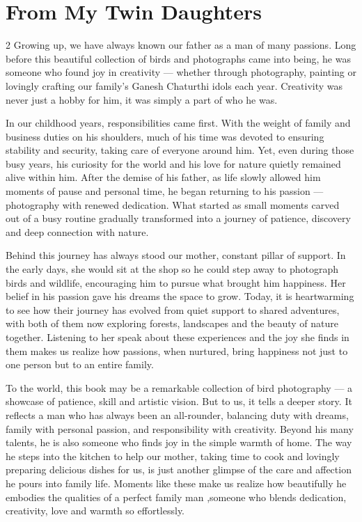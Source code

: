 \documentclass[12pt]{article}
\begin{document}
\section*{From My Twin Daughters}
\begin{multicols}{2}
\noindent Growing up, we have always known our father as a man of many passions. Long before this beautiful collection of birds and photographs came into being, he was someone who found joy in creativity — whether through photography, painting or lovingly crafting our family's Ganesh Chaturthi idols each year. Creativity was never just a hobby for him, it was simply a part of who he was.

In our childhood years, responsibilities came first. With the weight of family and business duties on his shoulders, much of his time was devoted to ensuring stability and security, taking care of everyone around him. Yet, even during those busy years, his curiosity for the world and his love for nature quietly remained alive within him. After the demise of his father, as life slowly allowed him moments of pause and personal time, he began returning to his passion — photography with renewed dedication. What started as small moments carved out of a busy routine gradually transformed into a journey of patience, discovery and deep connection with nature.

Behind this journey has always stood our mother, constant pillar of support. In the early days, she would sit at the shop so he could step away to photograph birds and wildlife, encouraging him to pursue what brought him happiness. Her belief in his passion gave his dreams the space to grow. Today, it is heartwarming to see how their journey has evolved from quiet support to shared adventures, with both of them now exploring forests, landscapes and the beauty of nature together. Listening to her speak about these experiences and the joy she finds in them makes us realize how passions, when nurtured, bring happiness not just to one person but to an entire family.

To the world, this book may be a remarkable collection of bird photography — a showcase of patience, skill and artistic vision. But to us, it tells a deeper story. It reflects a man who has always been an all-rounder, balancing duty with dreams, family with personal passion, and responsibility with creativity. Beyond his many talents, he is also someone who finds joy in the simple warmth of home. The way he steps into the kitchen to help our mother, taking time to cook and lovingly preparing delicious dishes for us, is just another glimpse of the care and affection he pours into family life. Moments like these make us realize how beautifully he embodies the qualities of a perfect family man ,someone who blends dedication, creativity, love and warmth so effortlessly.


\end{multicols}
\end{document}
